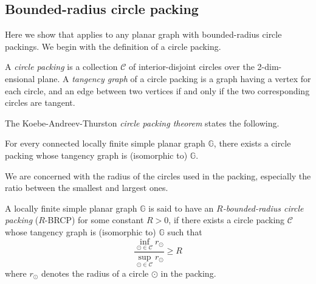 \documentclass{theoretics}
\def\=#1{\mathbb{#1}}
\newcommand{\eps}{\varepsilon}
\begin{document}
%

\subsection{Bounded-radius circle packing}\label{sec:circle-packing}

Here we show that  applies to any planar graph with bounded-radius circle packings.
We begin with the definition of a circle packing. 
\begin{definition}
A \emph{circle packing} is a collection $\mathcal{C}$ of interior-disjoint circles over the 2-dim-ensional plane. 
A \emph{tangency graph} of a circle packing is a graph having a vertex for each circle, and an edge between two vertices if and only if the two corresponding circles are tangent. 
\end{definition}

The Koebe-Andreev-Thurston \emph{circle packing theorem} states the following.
\begin{theorem}
For every connected locally finite simple planar graph $\mathbb{G}$, there exists a circle packing whose tangency graph is (isomorphic to) $\mathbb{G}$. 
\end{theorem}

We are concerned with the radius of the circles used in the packing, especially the ratio between the smallest and largest ones. 
\begin{definition}
  A locally finite simple planar graph $\mathbb{G}$ is said to have an \emph{$R$-bounded-radius circle packing} ($R$-BRCP) for some constant $R>0$, if there exists a circle packing $\mathcal{C}$ whose tangency graph is (isomorphic to) $\mathbb{G}$ such that
\[
\frac{\inf\limits_{\odot\in\mathcal{C}}r_{\odot}}{\sup\limits_{\odot\in\mathcal{C}}r_{\odot}}\geq R
\]
where $r_{\odot}$ denotes the radius of a circle $\odot$ in the packing. 
\end{definition}
\end{document}

